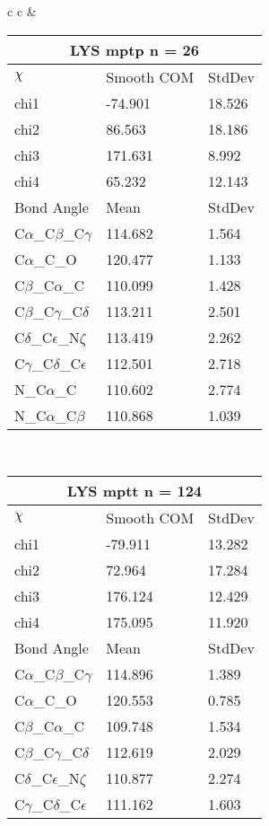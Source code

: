 \begin{longtable}{ c c }
  &
  \begin{tabular}{ l l l }
  \toprule
  \multicolumn{3}{c}{LYS \textbf{mptp} n = 26} \\ \toprule
  $\chi$       & Smooth COM & StdDev \\ \midrule
  chi1 & -74.901 & 18.526 \\ 
  chi2 & 86.563 & 18.186 \\ 
  chi3 & 171.631 & 8.992 \\ 
  chi4 & 65.232 & 12.143 \\ \midrule
  Bond Angle   & Mean     & StdDev \\ \midrule
  C$\alpha$\_C$\beta$\_C$\gamma$ & 114.682 & 1.564\\
  C$\alpha$\_C\_O & 120.477 & 1.133\\
  C$\beta$\_C$\alpha$\_C & 110.099 & 1.428\\
  C$\beta$\_C$\gamma$\_C$\delta$ & 113.211 & 2.501\\
  C$\delta$\_C$\epsilon$\_N$\zeta$ & 113.419 & 2.262\\
  C$\gamma$\_C$\delta$\_C$\epsilon$ & 112.501 & 2.718\\
  N\_C$\alpha$\_C & 110.602 & 2.774\\
  N\_C$\alpha$\_C$\beta$ & 110.868 & 1.039\\
  \bottomrule
  \end{tabular}
  \\
  \begin{tabular}{ l l l }
  \toprule
  \multicolumn{3}{c}{LYS \textbf{mptt} n = 124} \\ \toprule
  $\chi$       & Smooth COM & StdDev \\ \midrule
  chi1 & -79.911 & 13.282 \\ 
  chi2 & 72.964 & 17.284 \\ 
  chi3 & 176.124 & 12.429 \\ 
  chi4 & 175.095 & 11.920 \\ \midrule
  Bond Angle   & Mean     & StdDev \\ \midrule
  C$\alpha$\_C$\beta$\_C$\gamma$ & 114.896 & 1.389\\
  C$\alpha$\_C\_O & 120.553 & 0.785\\
  C$\beta$\_C$\alpha$\_C & 109.748 & 1.534\\
  C$\beta$\_C$\gamma$\_C$\delta$ & 112.619 & 2.029\\
  C$\delta$\_C$\epsilon$\_N$\zeta$ & 110.877 & 2.274\\
  C$\gamma$\_C$\delta$\_C$\epsilon$ & 111.162 & 1.603\\

\end{tabular}
\end{longtable}
